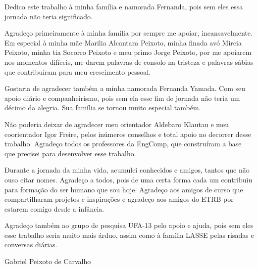 \documentclass{ufpatcc}
\begin{document}
\ufpaPaginaDeRosto

\ufpaPagRostodo

\ufpaPaginaDeAprovacao


\begin{ufpaOferecimento}
%

Dedico este trabalho \`{a} minha fam\'{i}lia e namorada Fernanda, pois sem eles essa
jornada n\~{a}o teria significado.

\end{ufpaOferecimento}


\begin{ufpaAgradecimentos}

Agrade\c{c}o primeiramente \`{a} minha fam\'{i}lia por sempre me apoiar, incansavelmente. Em
especial \`{a} minha m\~{a}e Marilia Alcantara Peixoto, minha finada av\'{o} Mircia Peixoto,
minha tia Socorro Peixoto e meu primo Jorge Peixoto, por me apoiarem nos
momentos dif\'{i}ceis, me darem palavras de consolo na tristeza e palavras s\'{a}bias
que contribu\'{i}ram para meu crescimento pessoal.

Gostaria de agradecer tamb\'{e}m a minha namorada Fernanda Yamada. Com seu apoio
di\'{a}rio e companheirismo, pois sem ela esse fim de jornada n\~{a}o teria um d\'{e}cimo da
alegria. Sua fam\'{i}lia se tornou muito especial tamb\'{e}m.

N\~{a}o poderia deixar de agradecer meu orientador Aldebaro Klautau e meu
coorientador Igor Freire, pelos in\'{u}meros conselhos e total apoio no decorrer
desse trabalho. Agrade\c{c}o todos os professores da EngComp, que constru\'{i}ram a base
que precisei para desenvolver esse trabalho.

Durante a jornada da minha vida, acumulei conhecidos e amigos, tantos que n\~{a}o
ouso citar nomes. Agrade\c{c}o a todos, pois de uma certa forma cada um contribuiu
para forma\c{c}\~{a}o do ser humano que sou hoje. Agrade\c{c}o aos amigos de curso que
compartilharam projetos e inspira\c{c}ões e agrade\c{c}o aos amigos do ETRB por estarem
comigo desde a inf\^{a}ncia.

Agrade\c{c}o tamb\'{e}m ao grupo de pesquisa UFA-13 pelo apoio e ajuda, pois sem eles
esse trabalho seria muito mais \'{a}rduo, assim como \`{a} fam\'{i}lia LASSE pelas risadas e
conversas di\'{a}rias.

\begin{flushright}
Gabriel Peixoto de Carvalho
\end{flushright}

\end{ufpaAgradecimentos}
\end{document}
